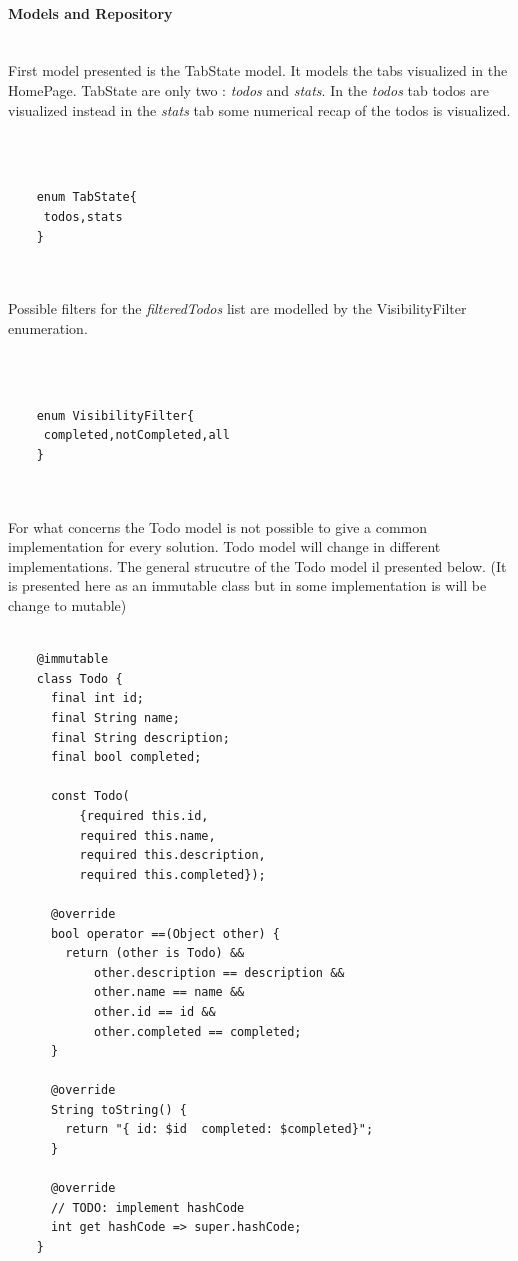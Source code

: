 	\mbox{}
	
	\paragraph{Models and Repository} \mbox{} \\
	\label{par:models_and_repository_todo_app}
	First model presented is the TabState model. It models the tabs visualized in the HomePage. TabState are only two : \textit{todos} and \textit{stats}. In the \textit{todos} tab todos are visualized instead in the \textit{stats} tab some numerical recap of the todos is visualized.

	\mbox{}\\
	
	 \mbox{}
	\begin{verbatim}
	
	enum TabState{
	 todos,stats
	}
	
	
	\end{verbatim}
	
	\mbox{}
	
	
	Possible filters for the \textit{filteredTodos} list are modelled by the VisibilityFilter enumeration.
	
	\mbox{}\\
	
	 \mbox{}
	\begin{verbatim}
	
	enum VisibilityFilter{
	 completed,notCompleted,all
	}
	
	
	\end{verbatim}
	
	\mbox{}
	
	For what concerns the Todo model is not possible to give a common implementation for every solution. Todo model will change in different implementations. The general strucutre of the Todo model il presented below. (It is presented here as an immutable class but in some implementation is will be change to mutable)
	\mbox{}\\
	
	 \mbox{}
	\begin{verbatim}
	
	@immutable
	class Todo {
	  final int id;
	  final String name;
	  final String description;
	  final bool completed;
	
	  const Todo(
	      {required this.id,
	      required this.name,
	      required this.description,
	      required this.completed});
	
	  @override
	  bool operator ==(Object other) {
	    return (other is Todo) &&
	        other.description == description &&
	        other.name == name &&
	        other.id == id &&
	        other.completed == completed;
	  }
	
	  @override
	  String toString() {
	    return "{ id: $id  completed: $completed}";
	  }
	
	  @override
	  // TODO: implement hashCode
	  int get hashCode => super.hashCode;
	}
	
	\end{verbatim}
	
